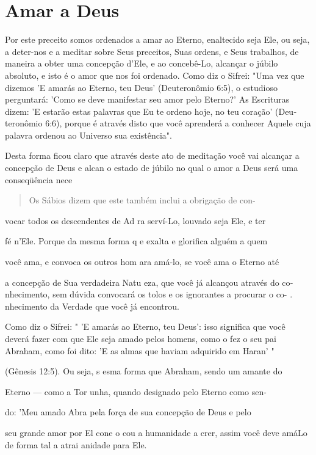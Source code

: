 \section{Amar a Deus}

Por este preceito somos ordenados a amar ao Eterno, enaltecido se­ja
Ele, ou seja, a deter-nos e a meditar sobre Seus preceitos, Suas ordens,
e Seus trabalhos, de maneira a obter uma concepção d'Ele, e ao
concebê-Lo, alcançar o júbilo absoluto, e isto é o amor que nos foi
ordenado. Como diz o Sifrei: "Uma vez que dizemos 'E amarás ao Eterno,
teu Deus' (Deuteronômio 6:5), o estu­dioso perguntará: 'Como se deve
manifestar seu amor pelo Eterno?' As Escritu­ras dizem: 'E estarão estas
palavras que Eu te ordeno hoje, no teu coração' (Deu­teronômio 6:6),
porque é através disto que você aprenderá a conhecer Aquele cuja palavra
ordenou ao Universo sua existência".

Desta forma ficou claro que através deste ato de meditação você vai
alcançar a concepção de Deus e alcan o estado de júbilo no qual o amor a
Deus será uma conseqüência nece

\begin{quote}
Os Sábios dizem que este também inclui a obrigação de con-
\end{quote}

vocar todos os descendentes de Ad ra serví-Lo, louvado seja Ele, e ter

fé n'Ele. Porque da mesma forma q e exalta e glorifica alguém a quem

você ama, e convoca os outros hom ara amá-lo, se você ama o Eterno até

a concepção de Sua verdadeira Natu eza, que você já alcançou através do
co­nhecimento, sem dúvida convocará os tolos e os ignorantes a procurar
o co- . nhecimento da Verdade que você já encontrou.

Como diz o Sifrei: " 'E amarás ao Eterno, teu Deus': isso significa que
você deverá fazer com que Ele seja amado pelos homens, como o fez o seu
pai Abraham, como foi dito: 'E as almas que haviam adquirido em Haran' "

(Gênesis 12:5). Ou seja, s esma forma que Abraham, sendo um amante do

Eterno --- como a Tor unha, quando designado pelo Eterno como sen-

do: 'Meu amado Abra pela força de sua concepção de Deus e pelo

seu grande amor por El cone o cou a humanidade a crer, assim você deve
amá­Lo de forma tal a atrai anidade para Ele.

